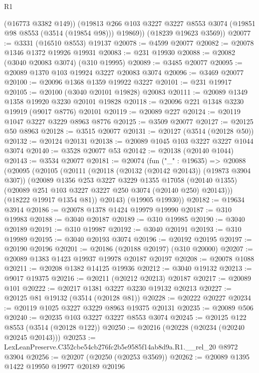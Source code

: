\begin{lexlean}{R1}
\begin{coremodule}
          (@16773 @3382 @149))
        (@19813 @266 @103 @3227 @3227 @8553 @3074 (@19851 @98 @8553 (@3514 (@19854 @98))) @19869))
      (@18239 @19623 @3569))
@20077 := @3331 (@16510 @8553) @19137
@20078 := @4599 @20077
@20082 := @20078 @1346 @1372 @19926 @19931
@20083 := @231 @19930
@20088 := @20082 (@3040 @20083 @3074) (@310 @19995)
@20089 := @3485 @20077
@20095 := @20089 @1370 @103 @19924 @3227 @20083 @3074
@20096 := @3469 @20077
@20100 := @20096 @1368 @1359 @19922 @3227
@20101 := @231 @19917
@20105 := @20100 (@3040 @20101 @19828) @20083
@20111 := @20089 @1349 @1358 @19920 @3230 @20101 @19828
@20118 := @20096 @221 @1348 @3230 @19919 (@9017 @8776) @20101
@20119 := @20089 @227
@20124 := @20119 @1047 @3227 @3229 @8963 @8776
@20125 := @3509 @20077
@20127 := @20125 @50 @8963
@20128 := @3515 @20077
@20131 := @20127 (@3514 (@20128 @50))
@20132 := @20124 @20131
@20138 := @20089 @1045 @103 @3227 @3227 @1044 @3074
@20140 := @3528 @20077 @53
@20142 := @20138 (@20140 @1044)
@20143 := @3534 @20077
@20181 := @20074
    (fun ("_" : @19635) =>
    @20088
      (@20095
        (@20105
          (@20111
            (@20118 (@20132 (@20142 @20143)) (@19873 @3904 @307))
            (@20089
              @1356
              @253
              @3227
              @3229
              @1355
              @17058
              (@20140 @1355)
              (@20089 @251 @103 @3227 @3227 @250 @3074 (@20140 @250) @20143)))
          (@18222 @19917 @1354 @81))
        @20143)
      (@19905 @19930))
@20182 := @19634 @3914
@20186 := @20078 @1378 @1424 @19979 @19990
@20187 := @310 @19983
@20188 := @3040 @20187
@20189 := @310 @19985
@20190 := @3040 @20189
@20191 := @310 @19987
@20192 := @3040 @20191
@20193 := @310 @19989
@20195 := @3040 @20193 @3074
@20196 := @20192 @20195
@20197 := @20190 @20196
@20201 := @20186 (@20188 @20197) (@310 @20000)
@20207 := @20089 @1383 @1423 @19937 @19978 @20187 @20197
@20208 := @20078 @1088
@20211 := @20208 @1382 @14125 @19936
@20212 := @3040 @19132
@20213 := @9017 @19375
@20216 := @20211 (@20212 @20213) @20187
@20217 := @20089 @101
@20222 := @20217 @1381 @3227 @3230 @19132 @20213
@20227 := @20125 @81 @19132 (@3514 (@20128 @81))
@20228 := @20222 @20227
@20234 := @20119 @1025 @3227 @3229 @8963 @19375 @20131
@20235 := @20089 @506
@20240 := @20235 @103 @3227 @3227 @8553 @3074
@20245 := @20125 @122 @8553 (@3514 (@20128 @122))
@20250 := @20216 (@20228 (@20234 (@20240 @20245 @20143)))
@20253 := LexLeanPreserve.C352cbe54cb276fc2b5e9585f14ab8d9a.R1.__rel_20 @8972 @3904
@20256 := @20207 (@20250 (@20253 @3569))
@20262 := @20089 @1395 @1422 @19950 @19977 @20189 @20196

\end{coremodule}
\end{lexlean}
